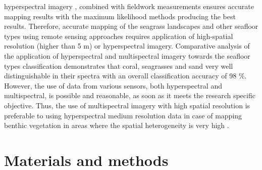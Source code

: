 \documentclass[10pt, a4paper]{article}
\begin{document}
hyperspectral imagery \cite{Peneva08}\label{Peneva08}, combined with fieldwork measurements ensures accurate
mapping results with the maximum likelihood methods producing the best results. 
Therefore, accurate mapping of the seagrass landscapes and other seafloor types using remote sensing
approaches requires application of high-spatial resolution (higher than 5 m) or hyperspectral imagery.
Comparative analysis of the application of hyperspectral and multispectral imagery towards the
seafloor types classification \cite{Hochberg03a}\label{Hochberg03a} demonstrates that coral, seagrasses and
sand very well distinguishable in their spectra with an overall classification accuracy of 98 \%.
However, the use of data from various sensors, both hyperspectral and multispectral, is possible and
reasonable, as soon as it meets the research specific objective. 
Thus, the use of multispectral imagery
with high spatial resolution is preferable to using hyperspectral medium resolution data in case of
mapping benthic vegetation in areas where the spatial heterogeneity is very high \cite{Vahtmae07}\label{Vahtmae07}.

\section{Materials and methods}\label{sec:3}
\end{document}

